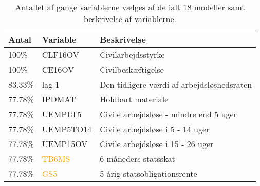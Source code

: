 \begin{table}[ht] 
\centering 
\begin{tabular}{lll}
\toprule 
Antal & Variable & Beskrivelse \\ \midrule
100\% &\textcolor{blue3}{CLF16OV} & Civilarbejdsstyrke \\
100\% &\textcolor{blue3}{CE16OV} & Civilbeskæftigelse \\
83.33\% & \textcolor{blue3}{lag 1} & Den tidligere værdi af arbejdsløshedsraten \\
77.78\% & \textcolor{chartreuse4}{IPDMAT} & Holdbart materiale  \\
77.78\% & \textcolor{blue3}{UEMPLT5} & Civile arbejdsløse - mindre end 5 uger \\
77.78\% & \textcolor{blue3}{UEMP5TO14}& Civile arbejdsløse i 5 - 14 uger \\
77.78\% & \textcolor{blue3}{UEMP15OV} &  Civile arbejdsløse i 15 - 26 uger  \\
77.78\% & \textcolor{orange}{TB6MS} & 6-måneders statsskat  \\
77.78\% & \textcolor{orange}{GS5} & 5-årig statsobligationsrente \\
\bottomrule
\end{tabular}  
\caption{Antallet af gange variablerne vælges af de ialt 18 modeller samt beskrivelse af variablerne.} \label{tab:topvariable}
\end{table} 